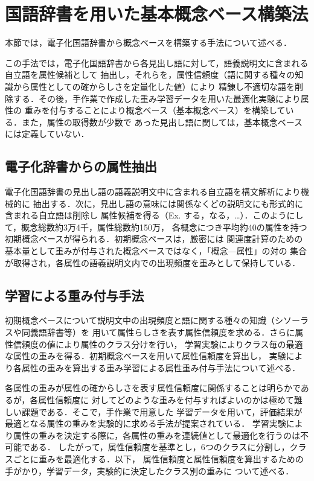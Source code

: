\documentclass[japanese]{jnlp_1.3e}
\begin{document}
\section{国語辞書を用いた基本概念ベース構築法} \label{kihon-make}

本節では，電子化国語辞書から概念ベースを構築する手法について述べる．

この手法では，電子化国語辞書から各見出し語に対して，語義説明文に含まれる自立語を属性候補として
抽出し，それらを，属性信頼度（語に関する種々の知識から属性としての確からしさを定量化した値）により
精錬し不適切な語を削除する\cite{kojima2004}．その後，手作業で作成した重み学習データを用いた最適化実験により属性の
重みを付与することにより概念ベース（基本概念ベース）を構築している．また，属性の取得数が少数で
あった見出し語に関しては，基本概念ベースには定義していない．



\subsection{電子化辞書からの属性抽出}

電子化国語辞書の見出し語の語義説明文中に含まれる自立語を構文解析により機械的に
抽出する．次に，見出し語の意味には関係なくどの説明文にも形式的に含まれる自立語は削除し
属性候補を得る（Ex. する，なる，…）．このようにして，概念総数約3万4千，属性総数約150万，
各概念につき平均約40の属性を持つ初期概念ベースが得られる．初期概念ベースは，厳密には
関連度計算のための基本量として重みが付与された概念ベースではなく，「概念—属性」の対の
集合が取得され，各属性の語義説明文内での出現頻度を重みとして保持している．



\subsection{学習による重み付与手法} \label{sec:gakushu}

初期概念ベースについて説明文中の出現頻度と語に関する種々の知識（シソーラスや同義語辞書等）を
用いて属性らしさを表す属性信頼度を求める\cite{kojima2004}．さらに属性信頼度の値により属性のクラス分けを行い，
学習実験によりクラス毎の最適な属性の重みを得る．初期概念ベースを用いて属性信頼度を算出し，
実験により各属性の重みを算出する重み学習による属性重み付与手法について述べる．

各属性の重みが属性の確からしさを表す属性信頼度に関係することは明らかであるが，各属性信頼度に
対してどのような重みを付与すればよいのかは極めて難しい課題である．そこで，手作業で用意した
学習データを用いて，評価結果が最適となる属性の重みを実験的に求める手法が提案されている．
学習実験により属性の重みを決定する際に，各属性の重みを連続値として最適化を行うのは不可能である．
したがって，属性信頼度を基準とし，6つのクラスに分割し，クラスごとに重みを最適化する．以下，
属性信頼度と属性信頼度を算出するための手がかり，学習データ，実験的に決定したクラス別の重みに
ついて述べる．
\end{document}
